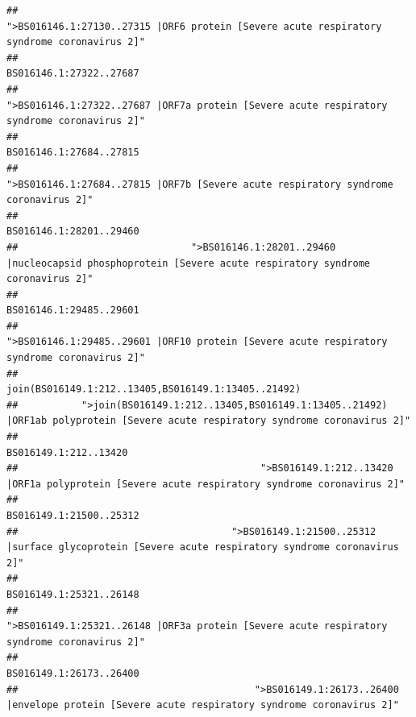 \documentclass[
]{article}
\begin{document}
\begin{verbatim}
##                                             ">BS016146.1:27130..27315 |ORF6 protein [Severe acute respiratory syndrome coronavirus 2]" 
##                                                                                                                BS016146.1:27322..27687 
##                                            ">BS016146.1:27322..27687 |ORF7a protein [Severe acute respiratory syndrome coronavirus 2]" 
##                                                                                                                BS016146.1:27684..27815 
##                                                    ">BS016146.1:27684..27815 |ORF7b [Severe acute respiratory syndrome coronavirus 2]" 
##                                                                                                                BS016146.1:28201..29460 
##                              ">BS016146.1:28201..29460 |nucleocapsid phosphoprotein [Severe acute respiratory syndrome coronavirus 2]" 
##                                                                                                                BS016146.1:29485..29601 
##                                            ">BS016146.1:29485..29601 |ORF10 protein [Severe acute respiratory syndrome coronavirus 2]" 
##                                                                                    join(BS016149.1:212..13405,BS016149.1:13405..21492) 
##           ">join(BS016149.1:212..13405,BS016149.1:13405..21492) |ORF1ab polyprotein [Severe acute respiratory syndrome coronavirus 2]" 
##                                                                                                                  BS016149.1:212..13420 
##                                          ">BS016149.1:212..13420 |ORF1a polyprotein [Severe acute respiratory syndrome coronavirus 2]" 
##                                                                                                                BS016149.1:21500..25312 
##                                     ">BS016149.1:21500..25312 |surface glycoprotein [Severe acute respiratory syndrome coronavirus 2]" 
##                                                                                                                BS016149.1:25321..26148 
##                                            ">BS016149.1:25321..26148 |ORF3a protein [Severe acute respiratory syndrome coronavirus 2]" 
##                                                                                                                BS016149.1:26173..26400 
##                                         ">BS016149.1:26173..26400 |envelope protein [Severe acute respiratory syndrome coronavirus 2]" 

\end{verbatim}
\end{document}
